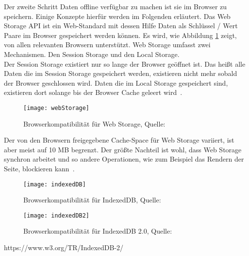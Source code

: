 Der zweite Schritt Daten offline verfügbar zu machen ist sie im Browser zu speichern. Einige Konzepte hierfür werden im Folgenden erläutert.
%
Das Web Storage \gls{API} ist ein Web-Standard mit dessen Hilfe Daten als Schlüssel / Wert Paare im Browser gespeichert werden können. Es wird, wie Abbildung \ref{fig:webStorage} zeigt, von allen relevanten Browsern unterstützt.
Web Storage umfasst zwei Mechanismen. Den Session Storage und den Local Storage.\\
Der Session Storage existiert nur so lange der Browser geöffnet ist.
Das heißt alle Daten die im Session Storage gespeichert werden, existieren nicht mehr sobald der Browser geschlossen wird. Daten die im Local Storage gespeichert sind, existieren dort solange bis der Browser Cache geleert wird~\cite{webstorage}.
\begin{figure}[H]
	\centering
	\texttt{[image: webStorage]}
	\grayRule
	\caption{Browserkompatibilität für Web Storage, Quelle: ~\cite{caniuse-ws}}
	\label{fig:webStorage}
\end{figure}
Der von den Browsern freigegebene Cache-Space für Web Storage variiert, ist aber meist auf 10 MB begrenzt. Der größte Nachteil ist wohl, dass Web Storage synchron arbeitet und so andere Operationen, wie zum Beispiel das Rendern der Seite, blockieren kann~\cite{webstorage-con}.
%
%
%
%
\begin{figure}[H]
	\centering
	\texttt{[image: indexedDB]}
	\grayRule
	\caption{Browserkompatibilität für IndexedDB, Quelle: ~\cite{caniuse-idb}}
	\label{fig:indexedDB}
\end{figure}
%
\begin{figure}[H]
	\centering
	\texttt{[image: indexedDB2]}
	\grayRule
	\caption{Browserkompatibilität für IndexedDB 2.0, Quelle: ~\cite{caniuse-idb}}
	\label{fig:indexedDB2}
\end{figure}
https://www.w3.org/TR/IndexedDB-2/